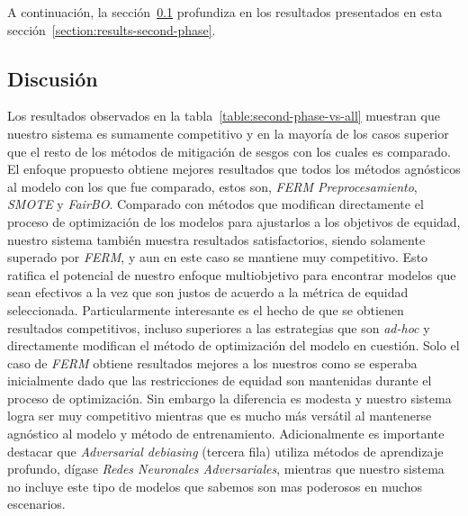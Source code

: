 A continuación, la sección~\ref{section:discussion-second-phase} profundiza en los resultados presentados en esta sección~\ref{section:results-second-phase}.

\subsection{Discusión}\label{section:discussion-second-phase}

Los resultados observados en la tabla~\ref{table:second-phase-vs-all} muestran que nuestro sistema es sumamente competitivo y en la mayoría de los casos superior que el resto de los métodos de mitigación de sesgos con los cuales es comparado.
El enfoque propuesto obtiene mejores resultados que todos los métodos agnósticos al modelo con los que fue comparado, estos son, \emph{FERM Preprocesamiento}, \emph{SMOTE} y \emph{FairBO}.
Comparado con métodos que modifican directamente el proceso de optimización de los modelos para ajustarlos a los objetivos de equidad, nuestro sistema también muestra resultados satisfactorios, siendo solamente superado por \emph{FERM}, y aun en este caso se mantiene muy competitivo.
Esto ratifica el potencial de nuestro enfoque multiobjetivo para encontrar modelos que sean efectivos a la vez que son justos de acuerdo a la métrica de equidad seleccionada.
Particularmente interesante es el hecho de que se obtienen resultados competitivos, incluso superiores a las estrategias que son \emph{ad-hoc} y directamente modifican el método de optimización del modelo en cuestión.
Solo el caso de \emph{FERM} obtiene resultados mejores a los nuestros como se esperaba inicialmente dado que las restricciones de equidad son mantenidas durante el proceso de optimización.
Sin embargo la diferencia es modesta y nuestro sistema logra ser muy competitivo mientras que es mucho más versátil al mantenerse agnóstico al modelo y método de entrenamiento.
Adicionalmente es importante destacar que \emph{Adversarial debiasing} (tercera fila) utiliza métodos de aprendizaje profundo, dígase \emph{Redes Neuronales Adversariales}, mientras que nuestro sistema no incluye este tipo de modelos que sabemos son mas poderosos en muchos escenarios.

